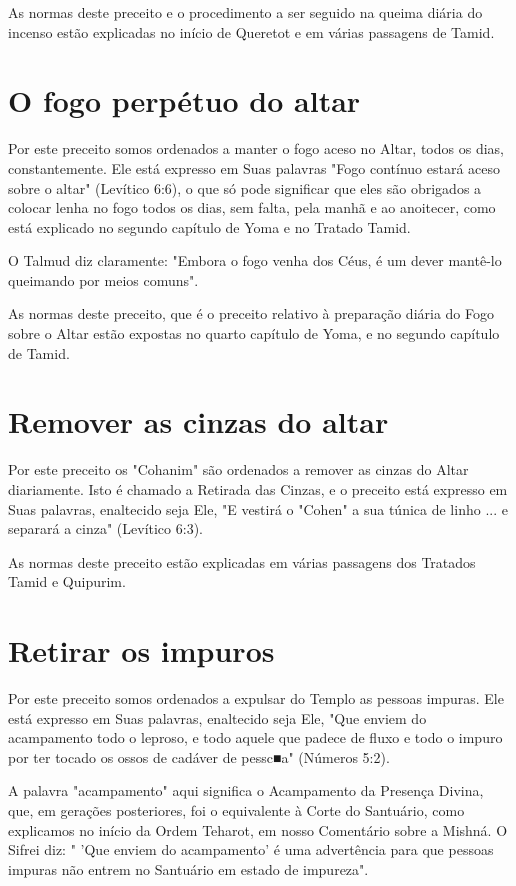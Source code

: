 \begin{itemize}
\begin{enumrate}
\begin{itemize}
\begin{itemize}
As normas deste preceito e o procedimento a ser seguido na queima diária
do incenso estão explicadas no início de Queretot e em várias passagens
de Tamid.

\section{O fogo perpétuo do altar}

Por este preceito somos ordenados a manter o fogo aceso no Altar, todos
os dias, constantemente. Ele está expresso em Suas palavras "Fogo
con­tínuo estará aceso sobre o altar" (Levítico 6:6), o que só pode
significar que eles são obrigados a colocar lenha no fogo todos os dias,
sem falta, pela manhã e ao anoitecer, como está explicado no segundo
capítulo de Yoma e no Trata­do Tamid.

O Talmud diz claramente: "Embora o fogo venha dos Céus, é um dever
mantê-lo queimando por meios comuns".

As normas deste preceito, que é o preceito relativo à preparação diária
do Fogo sobre o Altar estão expostas no quarto capítulo de Yoma, e no
segun­do capítulo de Tamid.

\section{Remover as cinzas do altar}

Por este preceito os "Cohanim" são ordenados a remover as cinzas do
Altar diariamente. Isto é chamado a Retirada das Cinzas, e o preceito
está expresso em Suas palavras, enaltecido seja Ele, "E vestirá o
"Cohen" a sua tú­nica de linho ... e separará a cinza" (Levítico 6:3).

As normas deste preceito estão explicadas em várias passagens dos
Tratados Tamid e Quipurim.

\section{Retirar os impuros}

Por este preceito somos ordenados a expulsar do Templo as pessoas
impuras. Ele está expresso em Suas palavras, enaltecido seja Ele, "Que
enviem do acampamento todo o leproso, e todo aquele que padece de fluxo
e todo o impuro por ter tocado os ossos de cadáver de pessc■a" (Números
5:2).

A palavra "acampamento" aqui significa o Acampamento da Presen­ça
Divina, que, em gerações posteriores, foi o equivalente à Corte do
Santuá­rio, como explicamos no início da Ordem Teharot, em nosso
Comentário so­bre a Mishná. O Sifrei diz: " 'Que enviem do acampamento'
é uma advertência para que pessoas impuras não entrem no Santuário em
estado de impureza".



\end{itemize}
\end{itemize}
\end{enumrate}
\end{itemize}
